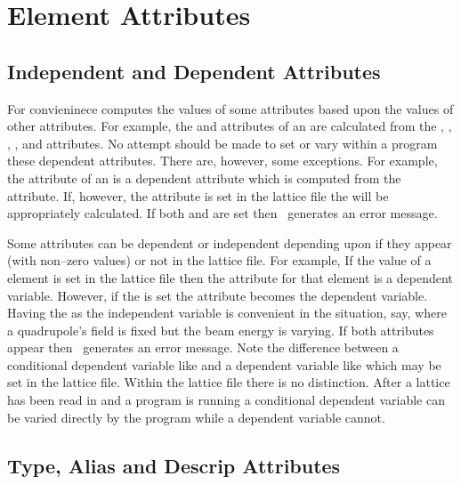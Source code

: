\chapter {Element Attributes}

\section{Independent and Dependent Attributes}

For convieninece \bmad computes the values of some attributes based
upon the values of other attributes. For example, the  and
 attributes of an  are calculated from
the , , , , and 
attributes. No attempt should be made to set or vary within a program
these dependent attributes. 
There are, however, some exceptions. For
example, the  attribute of an  is a dependent
attribute which is computed from the  attribute.  If,
however, the  attribute is set in the lattice file the
 will be appropriately calculated. If both 
and  are set then \bmad\ generates an error message. 


Some attributes can be dependent or independent depending upon if they
appear (with non--zero values) or not in the lattice file.  For
example, If the  value of a  element is set in
the lattice file then the  attribute for that element
is a dependent variable. However, if the  is set the
 attribute becomes the dependent variable. Having the
 as the independent variable is convenient in the
situation, say, where a quadrupole's field is fixed but the beam
energy is varying. If both attributes appear then \bmad\ generates an
error message. Note the difference between a conditional dependent 
variable like  and a dependent variable like  
which may be set in the lattice file. Within the lattice file there
is no distinction. After a lattice has been read in and a program is
running a conditional dependent variable can be varied directly
by the program while a dependent variable cannot.

\section{Type, Alias and Descrip Attributes}
\label{s:string}

